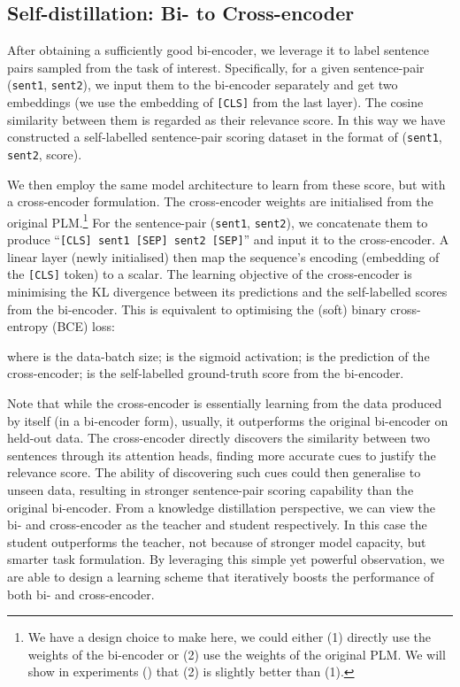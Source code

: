 \documentclass{article} \usepackage{iclr2021_conference,times}
\begin{document}
\subsection{Self-distillation: Bi- to Cross-encoder}\label{sec:bi_to_cross}

After obtaining a sufficiently good bi-encoder, we leverage it to label sentence pairs sampled from the task of interest. Specifically, for a given sentence-pair (\texttt{sent1}, \texttt{sent2}), we input them to the bi-encoder separately and get two embeddings (we use the embedding of \texttt{[CLS]} from the last layer). The cosine similarity between them is regarded as their relevance score. In this way we have constructed a self-labelled sentence-pair scoring dataset in the format of (\texttt{sent1}, \texttt{sent2}, score).

We then employ the same model architecture to learn from these score, but with a cross-encoder formulation. The cross-encoder weights are initialised from the original PLM.\footnote{We have a design choice to make here, we could either (1) directly use the weights of the bi-encoder or (2) use the weights of the original PLM. We will show in experiments () that (2) is slightly better than (1).}
For the sentence-pair (\texttt{sent1}, \texttt{sent2}), we concatenate them to produce ``\texttt{[CLS] sent1  [SEP] sent2 [SEP]}'' and input it to the cross-encoder. 
A linear layer (newly initialised) then map the sequence's encoding (embedding of the \texttt{[CLS]} token) to a scalar. 
The learning objective of the cross-encoder is minimising the KL divergence between its predictions and the self-labelled scores from the bi-encoder. This is equivalent to optimising the (soft) binary cross-entropy (BCE) loss:

where  is the data-batch size;  is the sigmoid activation;  is the prediction of the cross-encoder;  is the self-labelled ground-truth score from the bi-encoder. 

Note that while the cross-encoder is essentially learning from the data produced by itself (in a bi-encoder form), usually, it outperforms the original bi-encoder on held-out data.
The cross-encoder directly discovers the similarity between two sentences through its attention heads, finding more accurate cues to justify the relevance score. 
The ability of discovering such cues could then generalise to unseen data, resulting in stronger sentence-pair scoring capability than the original bi-encoder. From a knowledge distillation perspective, we can view the bi- and cross-encoder as the teacher and student respectively. In this case the student outperforms the teacher, not because of stronger model capacity, but smarter task formulation. By leveraging this simple yet powerful observation, we are able to design a learning scheme that iteratively boosts the performance of both bi- and cross-encoder.
\end{document}
